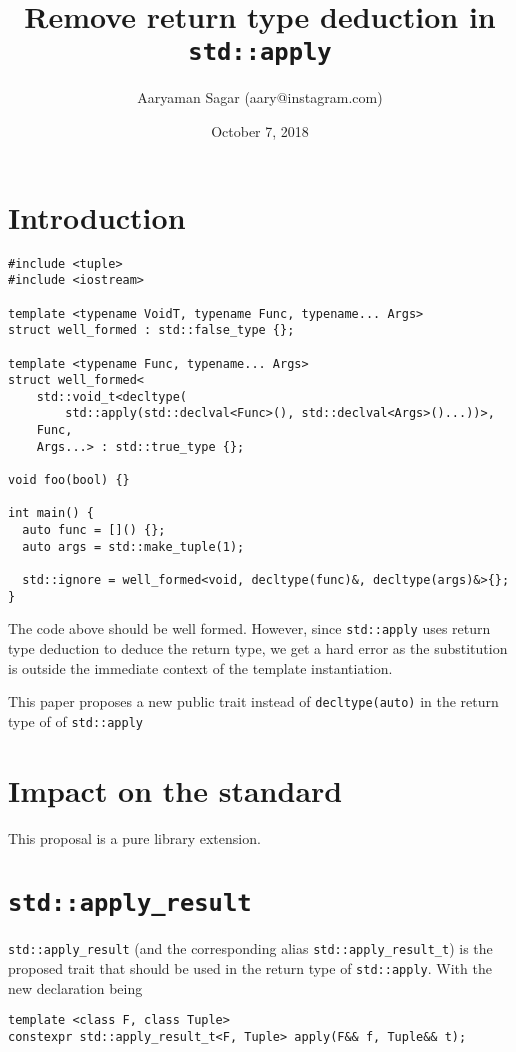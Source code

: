 \documentclass{article}
\begin{document}
\title{\textbf{Remove return type deduction in \texttt{std::apply}}}
\author{Aaryaman Sagar (aary@instagram.com)}
\date{October 7, 2018}
\maketitle

\section{Introduction}

\begin{lstlisting}
#include <tuple>
#include <iostream>

template <typename VoidT, typename Func, typename... Args>
struct well_formed : std::false_type {};

template <typename Func, typename... Args>
struct well_formed<
    std::void_t<decltype(
        std::apply(std::declval<Func>(), std::declval<Args>()...))>,
    Func,
    Args...> : std::true_type {};

void foo(bool) {}

int main() {
  auto func = []() {};
  auto args = std::make_tuple(1);

  std::ignore = well_formed<void, decltype(func)&, decltype(args)&>{};
}
\end{lstlisting}

The code above should be well formed.  However, since \texttt{std::apply} uses
return type deduction to deduce the return type, we get a hard error as the
substitution is outside the immediate context of the template instantiation.

This paper proposes a new public trait instead of \texttt{decltype(auto)} in
the return type of of \texttt{std::apply}

\section{Impact on the standard}
This proposal is a pure library extension.

\section{\texttt{std::apply\_result}}
\texttt{std::apply\_result} (and the corresponding alias
\texttt{std::apply\_result\_t}) is the proposed trait that should be used in
the return type of \texttt{std::apply}.  With the new declaration being

\begin{lstlisting}
template <class F, class Tuple>
constexpr std::apply_result_t<F, Tuple> apply(F&& f, Tuple&& t);
\end{lstlisting}
\end{document}
